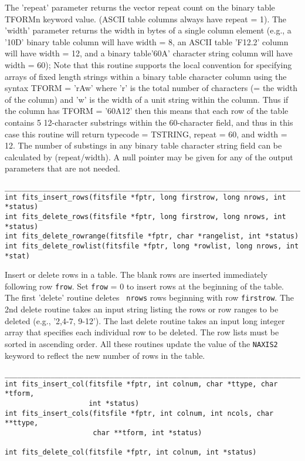 \documentclass[11pt]{article}
\begin{document}
The 'repeat' parameter returns the vector repeat count on the binary
table TFORMn keyword value. (ASCII table columns always have repeat
= 1).  The 'width' parameter returns the width in bytes of a single
column element (e.g., a '10D' binary table column will have width =
8, an ASCII table 'F12.2' column will have width = 12, and a binary
table'60A' character string  column will have width = 60);  Note that
this routine supports the local convention for specifying arrays of
fixed length strings within a binary table character column using
the syntax TFORM = 'rAw' where 'r' is the total number of
characters (= the width of the column) and 'w' is the width of a
unit string within the column.  Thus if the column has TFORM =
'60A12' then this means that each row of the table contains
5 12-character substrings within the 60-character field, and thus 
in this case this routine will return typecode = TSTRING, repeat =
60, and width = 12.  The number of substings in any binary table
character string field can be calculated by (repeat/width). 
A null pointer may be given for any of the output parameters that
 are not needed.

\begin{verbatim}
____________________________________________________________________________
int fits_insert_rows(fitsfile *fptr, long firstrow, long nrows, int *status)
int fits_delete_rows(fitsfile *fptr, long firstrow, long nrows, int *status)
int fits_delete_rowrange(fitsfile *fptr, char *rangelist, int *status)
int fits_delete_rowlist(fitsfile *fptr, long *rowlist, long nrows, int *stat)
\end{verbatim}

Insert or delete rows in a table.  The blank rows are inserted
immediately following row {\tt frow}. Set {\tt frow} = 0 to insert rows
at the beginning of the table.  The first 'delete' routine deletes {\tt
nrows} rows beginning with row {\tt firstrow}.   The 2nd delete routine
takes an input string listing the rows or row ranges to be deleted
(e.g., '2,4-7, 9-12').  The last delete routine takes an input long
integer array that specifies each individual row to be deleted.  The
row lists must be sorted in ascending order.  All these routines update
the value of the {\tt NAXIS2} keyword to reflect the new number of rows
in the table.

\begin{verbatim}
_________________________________________________________________________
int fits_insert_col(fitsfile *fptr, int colnum, char *ttype, char *tform,
                    int *status)
int fits_insert_cols(fitsfile *fptr, int colnum, int ncols, char **ttype,
                     char **tform, int *status)

int fits_delete_col(fitsfile *fptr, int colnum, int *status)
\end{verbatim}
\end{document}
